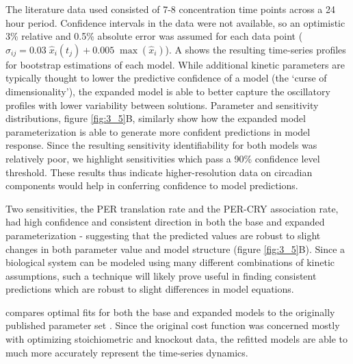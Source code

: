 {The literature data used consisted of 7-8 concentration time points across a 24 hour period. 
Confidence intervals in the data were not available, so an optimistic 3\% relative and 0.5\% absolute error was assumed for each data point ($\sigma_{ij} = 0.03\;\hat{x}_{i}(t_j) + 0.005\;\max(\hat{x}_i)$). 
A shows the resulting time-series profiles for bootstrap estimations of each model. 
While additional kinetic parameters are typically thought to lower the predictive confidence of a model (the `curse of dimensionality'), the expanded model is able to better capture the oscillatory profiles with lower variability between solutions. 
Parameter and sensitivity distributions, figure \ref{fig:3_5}B, similarly show how the expanded model parameterization is able to generate more confident predictions in model response. 
Since the resulting sensitivity identifiability for both models was relatively poor, we highlight sensitivities which pass a 90\% confidence level threshold. 
These results thus indicate higher-resolution data on circadian components would help in conferring confidence to model predictions.

Two sensitivities, the PER translation rate and the PER-CRY association rate, had high confidence and consistent direction in both the base and expanded parameterization - suggesting that the predicted values are robust to slight changes in both parameter value and model structure (figure \ref{fig:3_5}B). 
Since a biological system can be modeled using many different combinations of kinetic assumptions, such a technique will likely prove useful in finding consistent predictions which are robust to slight differences in model equations.

 compares optimal fits for both the base and expanded models to the originally published parameter set \cite{Hirota2012}. 
Since the original cost function was concerned mostly with optimizing stoichiometric and knockout data, the refitted models are able to much more accurately represent the time-series dynamics. 

}
